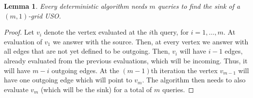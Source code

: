 \documentclass[a4paper,10pt]{article}
\newtheorem{lemma}{Lemma}
\begin{document}
\begin{lemma}\label{lem:kx1}
Every deterministic algorithm needs $m$ queries to find the sink of a $(m,1)$-grid USO. 
\end{lemma}
\begin{proof}
Let $v_i$ denote the vertex evaluated at the $i$th query, for $i=1,\ldots, m$. At evaluation of $v_1$ we answer with the source. Then, at every vertex 
we answer with all edges that are not yet defined to be outgoing. Then, $v_i$ will have $i-1$ edges, already evaluated from the previous evaluations, which will 
be incoming. Thus, it will have $m-i$ outgoing edges. At the $(m-1)$th iteration the vertex $v_{m-1}$ will have one outgoing edge which will point to $v_m$.
The algorithm then needs to also evaluate $v_m$ (which will be the sink) for a total of $m$ queries. 
\end{proof}
\end{document}
